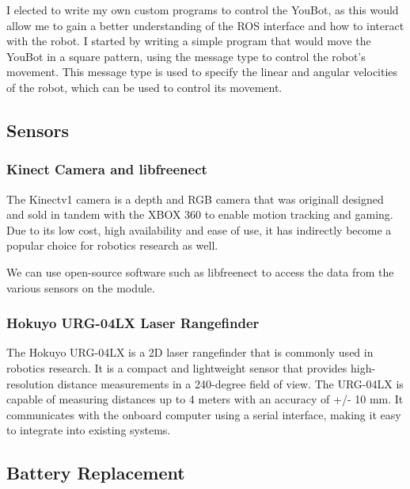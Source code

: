 \documentclass[a4paper, 12pt]{article}
\newif\ifshownotes
\newcommand{\notes}[1]{\ifshownotes\textcolor{blue}{#1}\fi}
\newcommand{\code}[1]{\texttt{\detokenize{#1}}}
\begin{document}
    I elected to write my own custom programs to control the YouBot, as this would allow me to gain a better understanding of the ROS interface and how to interact with the robot. I started by writing a simple program that would move the YouBot in a square pattern, using the \code{geometry\_msgs/Twist} message type to control the robot's movement. This message type is used to specify the linear and angular velocities of the robot, which can be used to control its movement. 
    

    
    \subsection{Sensors}
    \subsubsection{Kinect Camera and libfreenect}

    The Kinectv1 camera is a depth and RGB camera that was originall designed and sold in tandem with the XBOX 360 to enable motion tracking and gaming. Due to its low cost, high availability and ease of use, it has indirectly become a popular choice for robotics research as well. 

    We can use open-source software such as libfreenect to access the data from the various sensors on the module.


    \notes{discuss the libfreenect library, how to install it, and how it could be used within ROS.}


    \subsubsection{Hokuyo URG-04LX Laser Rangefinder}

    The Hokuyo URG-04LX is a 2D laser rangefinder that is commonly used in robotics research. It is a compact and lightweight sensor that provides high-resolution distance measurements in a 240-degree field of view. The URG-04LX is capable of measuring distances up to 4 meters with an accuracy of +/- 10 mm. It communicates with the onboard computer using a serial interface, making it easy to integrate into existing systems.

    \notes{discuss installing the drivers and whatnot, and how to use it within ROS and rqt.}



    \subsection{Battery Replacement}
    \label{sec:battery-replacement}
\end{document}
